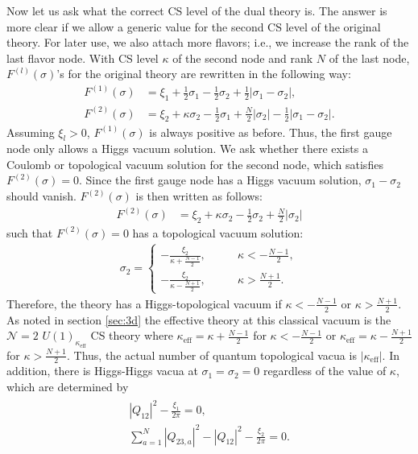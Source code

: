 \documentclass[a4paper,11pt]{article}
\begin{document}
Now let us ask what the correct CS level of the dual theory is. The answer is more clear if we allow a generic value for the second CS level of the original theory. For later use, we also attach more flavors; i.e., we increase the rank of the last flavor node. With CS level $\kappa$ of the second node and rank $N$ of the last node, $F^{(l)} (\sigma)$'s for the original theory are rewritten in the following way:
\begin{align}
F^{(1)} (\sigma) &= \xi_1+\frac{1}{2} \sigma_1-\frac{1}{2} \sigma_2+\frac{1}{2} |\sigma_1-\sigma_2|, \\
F^{(2)} (\sigma) &= \xi_2+\kappa \sigma_2-\frac{1}{2} \sigma_1+\frac{N}{2} |\sigma_2|-\frac{1}{2} |\sigma_1-\sigma_2|.
\end{align}
Assuming $\xi_l > 0$, $F^{(1)} (\sigma)$ is always positive as before. Thus, the first gauge node only allows a Higgs vacuum solution. We ask whether there exists a Coulomb or topological vacuum solution for the second node, which satisfies $F^{(2)} (\sigma) = 0$. Since the first gauge node has a Higgs vacuum solution, $\sigma_1-\sigma_2$ should vanish. $F^{(2)} (\sigma)$ is then written as follows:
\begin{align}
F^{(2)} (\sigma) &= \xi_2+\kappa \sigma_2-\frac{1}{2} \sigma_2+\frac{N}{2} |\sigma_2|
\end{align}
such that $F^{(2)} (\sigma) = 0$ has a topological vacuum solution:
\begin{align}
\label{eq:top}
\sigma_2 = \left\{\begin{array}{cc}
-\frac{\xi_2}{\kappa+\frac{N-1}{2}}, \qquad & \kappa < -\frac{N-1}{2}, \\
-\frac{\xi_2}{\kappa-\frac{N+1}{2}}, \qquad & \kappa > \frac{N+1}{2}.
\end{array}\right.
\end{align}
Therefore, the theory has a Higgs-topological vacuum if $\kappa < -\frac{N-1}{2}$ or $\kappa > \frac{N+1}{2}$. As noted in section \ref{sec:3d} the effective theory at this classical vacuum is the $\mathcal N = 2$ $U(1)_{\kappa_\text{eff}}$ CS theory where $\kappa_\text{eff} = \kappa+\frac{N-1}{2}$ for $\kappa < -\frac{N-1}{2}$ or $\kappa_\text{eff} = \kappa-\frac{N+1}{2}$ for $\kappa > \frac{N+1}{2}$. Thus, the actual number of quantum topological vacua is $|\kappa_\text{eff}|$. In addition, there is Higgs-Higgs vacua at $\sigma_1 = \sigma_2 = 0$ regardless of the value of $\kappa$, which are determined by
\begin{gather}
\begin{gathered}
\label{eq:Higgs vacuum}
|Q_{12}|^2-\frac{\xi_1}{2 \pi} = 0, \\
\sum_{a = 1}^N |Q_{23,a}|^2-|Q_{12}|^2-\frac{\xi_2}{2 \pi} = 0.
\end{gathered}
\end{gather}
\end{document}
